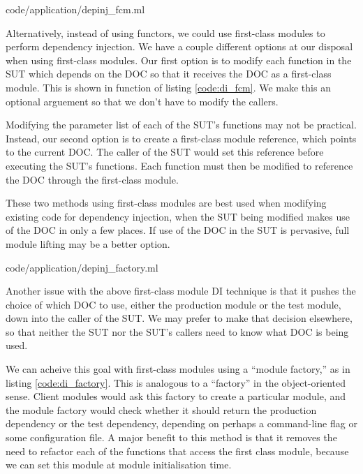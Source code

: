 {code/application/depinj_fcm.ml}

Alternatively, instead of using functors, we could use first-class
modules to perform dependency injection. We have a couple different
options at our disposal when using first-class modules. Our first
option is to modify each function in the SUT which depends on the DOC
so that it receives the DOC as a first-class module. This is shown in
function  of listing \ref{code:di_fcm}. We make this an
optional arguement so that we don't have to modify the callers.

Modifying the parameter list of each of the SUT's functions may not be
practical. Instead, our second option is to create a first-class
module reference, which points to the current DOC. The caller of the
SUT would set this reference before executing the SUT's
functions. Each function must then be modified to reference the DOC
through the first-class module.

These two methods using first-class modules are best used when
modifying existing code for dependency injection, when the SUT being
modified makes use of the DOC in only a few places. If use of the DOC
in the SUT is pervasive, full module lifting may be a better option.

 {code/application/depinj_factory.ml}

Another issue with the above first-class module DI technique is that
it pushes the choice of which DOC to use, either the production module
or the test module, down into the caller of the SUT. We may prefer to
make that decision elsewhere, so that neither the SUT nor the SUT's
callers need to know what DOC is being used.

We can acheive this goal with first-class modules using a ``module
factory,'' as in listing \ref{code:di_factory}. This is analogous to a
``factory'' in the object-oriented sense. Client modules would ask
this factory to create a particular module, and the module factory
would check whether it should return the production dependency or the
test dependency, depending on perhaps a command-line flag or some
configuration file. A major benefit to this method is that it removes
the need to refactor each of the functions that access the first class
module, because we can set this module at module initialisation time.

